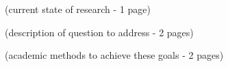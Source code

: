 \documentclass[12pt]{article}
\begin{document}
(current state of research - 1 page)

(description of question to address - 2 pages)

(academic methods to achieve these goals - 2 pages)


\end{document}
